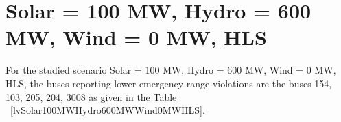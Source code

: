 \documentclass[10pt]{report}
\begin{document}
\section{Solar = 100 MW, Hydro = 600 MW, Wind = 0 MW, HLS}
For the studied scenario Solar = 100 MW, Hydro = 600 MW, Wind = 0 MW, HLS, the buses reporting lower emergency range violations are the buses 154, 103, 205, 204, 3008 as given in the Table ~\ref{lvSolar100MWHydro600MWWind0MWHLS}.
\begin{table}[H]
\caption{Contingencies reporting bus voltages lower than emergency voltage of 1.1 PU for scenario Solar = 100 MW, Hydro = 600 MW, Wind = 0 MW, HLS}
\label{lvSolar100MWHydro600MWWind0MWHLS}
\centering
{}
\end{table}
\end{document}
